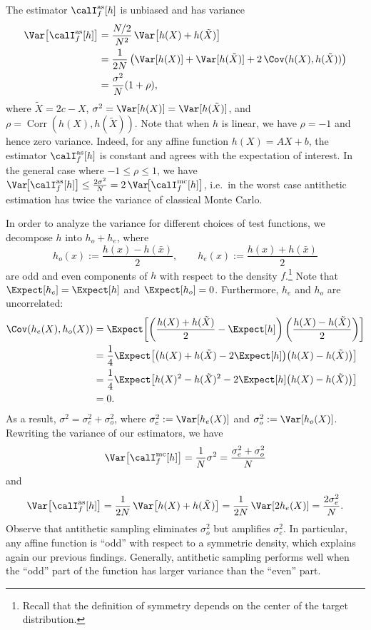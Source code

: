 The estimator $\calI_f^{\mathrm{as}}[h]$ is unbiased and has variance
\begin{align*}
  \Var\!\left[\calI_f^{\mathrm{as}}[h]\right]
  &= \frac{N/2}{N^2}\,\Var\!\left[h(X) + h(\tilde{X})\right] \\
  &= \frac{1}{2N}\left(
       \Var[h(X)] + \Var[h(\tilde{X})] + 2\,\Cov(h(X), h(\tilde{X}))
     \right) \\
  &= \frac{\sigma^2}{N}(1 + \rho),
\end{align*}
where $\tilde{X} = 2c - X$, $\sigma^2 = \Var[h(X)] = \Var[h(\tilde{X})]$, and
$\rho = \operatorname{Corr}(h(X), h(\tilde{X}))$. Note that when $h$ is linear,
we have $\rho = -1$ and hence zero variance. Indeed, for any affine function
$h(X) = AX + b$, the estimator $\calI_f^{\mathrm{as}}[h]$ is constant and
agrees with the expectation of interest. In the general case where
$-1 \leq \rho \leq 1$, we have
$\Var\!\bigl[\calI_f^{\mathrm{as}}[h]\bigr] \leq \tfrac{2\sigma^2}{N}
= 2\,\Var\!\bigl[\calI_f^{\mathrm{mc}}[h]\bigr]$,
i.e.\ in the worst case antithetic estimation has twice the variance of
classical Monte Carlo.

In order to analyze the variance for different choices of test functions, we
decompose $h$ into $h_o + h_e$, where
\[
  h_o(x) := \frac{h(x) - h(\bar{x})}{2}, \qquad
  h_e(x) := \frac{h(x) + h(\bar{x})}{2}
\]
are odd and even components of $h$ with respect to the density $f$.\footnote{%
  Recall that the definition of symmetry depends on the center of the target
  distribution.}
Note that $\Expect[h_e] = \Expect[h]$ and $\Expect[h_o] = 0$. Furthermore,
$h_e$ and $h_o$ are uncorrelated:
\begin{align*}
  \Cov(h_e(X), h_o(X))
  &= \Expect\!\left[
       \left(\frac{h(X)+h(\tilde{X})}{2} - \Expect[h]\right)
       \left(\frac{h(X)-h(\tilde{X})}{2}\right)
     \right] \\
  &= \frac{1}{4}\Expect\!\left[
       \bigl(h(X)+h(\tilde{X})-2\Expect[h]\bigr)\bigl(h(X)-h(\tilde{X})\bigr)
     \right] \\
  &= \frac{1}{4}\Expect\!\left[
       h(X)^2 - h(\tilde{X})^2 - 2\Expect[h]\bigl(h(X)-h(\tilde{X})\bigr)
     \right] \\
  &= 0.
\end{align*}
As a result, $\sigma^2 = \sigma_e^2 + \sigma_o^2$, where
$\sigma_e^2 := \Var[h_e(X)]$ and $\sigma_o^2 := \Var[h_o(X)]$. Rewriting the
variance of our estimators, we have
\[
  \Var\!\left[\calI_f^{\mathrm{mc}}[h]\right]
  = \frac{1}{N}\sigma^2
  = \frac{\sigma_e^2 + \sigma_o^2}{N}
\]
and
\[
  \Var\!\left[\calI_f^{\mathrm{as}}[h]\right]
  = \frac{1}{2N}\,\Var\!\left[h(X)+h(\tilde{X})\right]
  = \frac{1}{2N}\,\Var\!\left[2h_e(X)\right]
  = \frac{2\sigma_e^2}{N}.
\]
Observe that antithetic sampling eliminates $\sigma_o^2$ but amplifies
$\sigma_e^2$. In particular, any affine function is ``odd'' with respect to a
symmetric density, which explains again our previous findings. Generally,
antithetic sampling performs well when the ``odd'' part of the function has
larger variance than the ``even'' part.

